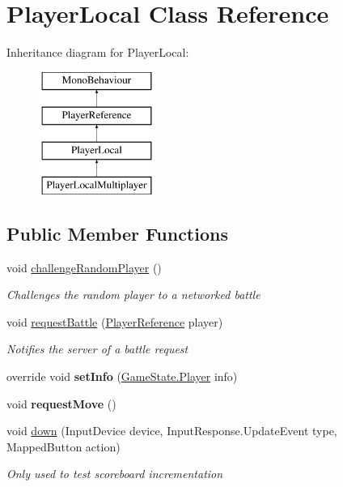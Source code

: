 \hypertarget{class_player_local}{\section{Player\-Local Class Reference}
\label{class_player_local}
}
Inheritance diagram for Player\-Local\-:\begin{figure}[H]
\begin{center}
\leavevmode
\includegraphics[height=4.000000cm]{class_player_local}
\end{center}
\end{figure}
\subsection*{Public Member Functions}
\begin{DoxyCompactItemize}
\item 
void \hyperlink{class_player_local_aa5c459588b976499120386eda1c1fac0}{challenge\-Random\-Player} ()
\begin{DoxyCompactList}\small\item\em Challenges the random player to a networked battle \end{DoxyCompactList}\item 
void \hyperlink{class_player_local_a5344425e801a7f02419bf29ede2cb2af}{request\-Battle} (\hyperlink{class_player_reference}{Player\-Reference} player)
\begin{DoxyCompactList}\small\item\em Notifies the server of a battle request \end{DoxyCompactList}\item 
\hypertarget{class_player_local_a811782eb0815d88b3a1e5c8d23ee4903}{override void {\bfseries set\-Info} (\hyperlink{struct_game_state_1_1_player}{Game\-State.\-Player} info)}\label{class_player_local_a811782eb0815d88b3a1e5c8d23ee4903}

\item 
\hypertarget{class_player_local_a71d5b41f860d3f8841f58a11aff1a6c3}{void {\bfseries request\-Move} ()}\label{class_player_local_a71d5b41f860d3f8841f58a11aff1a6c3}

\item 
void \hyperlink{class_player_local_ab718bcb062155f6de683dc8e78a799ba}{down} (Input\-Device device, Input\-Response.\-Update\-Event type, Mapped\-Button action)
\begin{DoxyCompactList}\small\item\em Only used to test scoreboard incrementation \end{DoxyCompactList}\end{DoxyCompactItemize}
